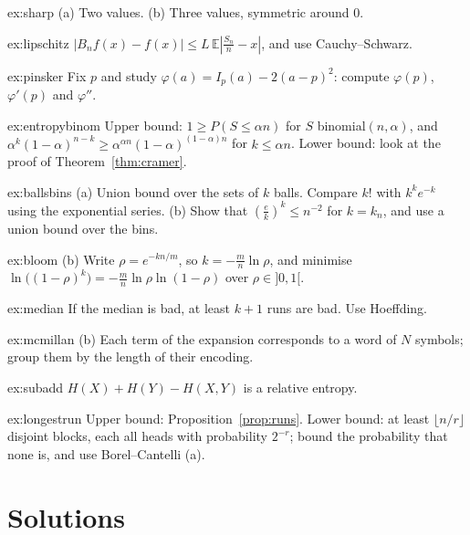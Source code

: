 \begin{hint}{ex:sharp}
(a) Two values. (b) Three values, symmetric around $0$.
\end{hint}
\begin{hint}{ex:lipschitz}
$|B_nf(x)-f(x)|\le L\,\mathbb E|\frac{S_n}n-x|$, and use Cauchy--Schwarz.
\end{hint}
\begin{hint}{ex:pinsker}
Fix $p$ and study $\varphi(a)=I_p(a)-2(a-p)^2$: compute $\varphi(p)$, $\varphi'(p)$ and $\varphi''$.
\end{hint}
\begin{hint}{ex:entropybinom}
Upper bound: $1\ge P(S\le\alpha n)$ for $S$ binomial$(n,\alpha)$, and $\alpha^k(1-\alpha)^{n-k}\ge\alpha^{\alpha n}(1-\alpha)^{(1-\alpha)n}$ for $k\le\alpha n$. Lower bound: look at the
proof of Theorem~\ref{thm:cramer}.
\end{hint}
\begin{hint}{ex:ballsbins}
(a) Union bound over the sets of $k$ balls. Compare $k!$ with $k^ke^{-k}$ using the exponential series. (b) Show that $(\frac ek)^k\le n^{-2}$
for $k=k_n$, and use a union bound over the bins.
\end{hint}
\begin{hint}{ex:bloom}
(b) Write $\rho=e^{-kn/m}$, so $k=-\frac mn\ln\rho$, and minimise $\ln\bigl((1-\rho)^k\bigr)=-\frac mn\ln\rho\ln(1-\rho)$ over $\rho\in]0,1[$.
\end{hint}
\begin{hint}{ex:median}
If the median is bad, at least $k+1$ runs are bad. Use Hoeffding.
\end{hint}
\begin{hint}{ex:mcmillan}
(b) Each term of the expansion corresponds to a word of $N$ symbols; group them by the length of their encoding.
\end{hint}
\begin{hint}{ex:subadd}
$H(X)+H(Y)-H(X,Y)$ is a relative entropy.
\end{hint}
\begin{hint}{ex:longestrun}
Upper bound: Proposition~\ref{prop:runs}. Lower bound: at least $\lfloor n/r\rfloor$ disjoint blocks, each all heads with probability $2^{-r}$; bound the
probability that none is, and use Borel--Cantelli (a).
\end{hint}

\section{Solutions}


